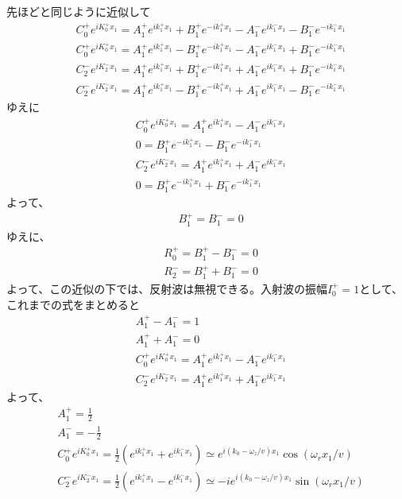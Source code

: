 先ほどと同じように近似して
\begin{align}
&C_{0}^{+}e^{iK_{0}^{+}x_{1}}=A_{1}^{+}e^{ik_{1}^{+}x_{1}}+B_{1}^{+}e^{-ik_{1}^{+}x_{1}}-A_{1}^{-}e^{ik_{1}^{-}x_{1}}-B_{1}^{-}e^{-ik_{1}^{-}x_{1}} \\
&C_{0}^{+}e^{iK_{0}^{+}x_{1}}=A_{1}^{+}e^{ik_{1}^{+}x_{1}}-B_{1}^{+}e^{-ik_{1}^{+}x_{1}}-A_{1}^{-}e^{ik_{1}^{-}x_{1}}+B_{1}^{-}e^{-ik_{1}^{-}x_{1}} \\
&C_{2}^{-}e^{iK_{2}^{-}x_{1}}=A_{1}^{+}e^{ik_{1}^{+}x_{1}}+B_{1}^{+}e^{-ik_{1}^{+}x_{1}}+A_{1}^{-}e^{ik_{1}^{-}x_{1}}+B_{1}^{-}e^{-ik_{1}^{-}x_{1}} \\
&C_{2}^{-}e^{iK_{2}^{-}x_{1}}=A_{1}^{+}e^{ik_{1}^{+}x_{1}}-B_{1}^{+}e^{-ik_{1}^{+}x_{1}}+A_{1}^{-}e^{ik_{1}^{-}x_{1}}-B_{1}^{-}e^{-ik_{1}^{-}x_{1}} 
\end{align}
ゆえに
\begin{align}
&C_{0}^{+}e^{iK_{0}^{+}x_{1}}=A_{1}^{+}e^{ik_{1}^{+}x_{1}}-A_{1}^{-}e^{ik_{1}^{-}x_{1}} \\
&0=B_{1}^{+}e^{-ik_{1}^{+}x_{1}}-B_{1}^{-}e^{-ik_{1}^{-}x_{1}} \\
&C_{2}^{-}e^{iK_{2}^{-}x_{1}}=A_{1}^{+}e^{ik_{1}^{+}x_{1}}+A_{1}^{-}e^{ik_{1}^{-}x_{1}} \\
&0=B_{1}^{+}e^{-ik_{1}^{+}x_{1}}+B_{1}^{-}e^{-ik_{1}^{-}x_{1}} 
\end{align}
よって、
\begin{align}
&B_{1}^{+}=B_{1}^{-}=0 
\end{align}
ゆえに、
\begin{align}
&R_{0}^{+}=B_{1}^{+}-B_{1}^{-}=0 \\
&R_{2}^{-}=B_{1}^{+}+B_{1}^{-}=0
\end{align}
よって、この近似の下では、反射波は無視できる。入射波の振幅$I_{0}^{+}=1$として、これまでの式をまとめると
\begin{align}
&A_{1}^{+}-A_{1}^{-}=1 \\
&A_{1}^{+}+A_{1}^{-}=0 \\
&C_{0}^{+}e^{iK_{0}^{+}x_{1}}=A_{1}^{+}e^{ik_{1}^{+}x_{1}}-A_{1}^{-}e^{ik_{1}^{-}x_{1}} \\
&C_{2}^{-}e^{iK_{2}^{-}x_{1}}=A_{1}^{+}e^{ik_{1}^{+}x_{1}}+A_{1}^{-}e^{ik_{1}^{-}x_{1}}
\end{align}
よって、
\begin{align}
&A_{1}^{+}=\frac{1}{2} \\
&A_{1}^{-}=-\frac{1}{2} \\
&C_{0}^{+}e^{iK_{0}^{+}x_{1}}=\frac{1}{2}(e^{ik_{1}^{+}x_{1}}+e^{ik_{1}^{-}x_{1}}){\simeq}e^{i(k_{0}-{\omega_{z}}/{v})x_{1}}\cos{({\omega_{r}}x_{1}/{v})} \\
&C_{2}^{-}e^{iK_{2}^{-}x_{1}}=\frac{1}{2}(e^{ik_{1}^{+}x_{1}}-e^{ik_{1}^{-}x_{1}}){\simeq}-ie^{i(k_{0}-{\omega_{z}}/{v})x_{1}}\sin{({\omega_{r}}x_{1}/{v})}
\end{align}
